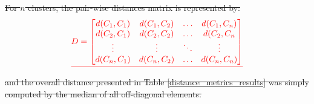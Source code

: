 \documentclass[journal,article,submit,pdftex,moreauthors]{Definitions/mdpi}
\providecommand{\DIFdel}[1]{{\protect\color{red}\sout{#1}}}                      %
\providecommand{\DIFdelbegin}{} %
\providecommand{\DIFdelend}{} %
\begin{document}
\DIFdelbegin \DIFdel{For $n$ clusters, the pair-wise distances matrix is represented by:
}\begin{displaymath}
\DIFdel{D =  
\begin{bmatrix}
d(C_{1}, C_{1}) & d(C_{1}, C_{2}) & \hdots & d(C_{1}, C_{n})\\
d(C_{2}, C_{1}) & d(C_{2}, C_{2}) & \hdots & d(C_{2}, C_{n}\\
\vdots           &  \vdots          & \ddots & \vdots\\
d(C_{n}, C_{1}) & d(C_{n}, C_{2}) & \hdots & d(C_{n}, C_{n})
\end{bmatrix}
}\end{displaymath}%
\DIFdel{and the overall distance presented in  Table \ref{distance_metrics_results} was simply computed by the median of all off-diagonal elements.
}\DIFdelend %
\end{document}
